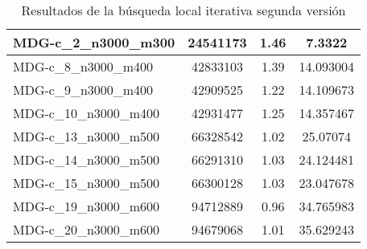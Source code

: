 \documentclass[11pt,a4paper]{article}
\begin{document}
\begin{table}[H]
\begin{center}
\begin{tabular}{|l|c|c|c|}
					MDG-c\_2\_n3000\_m300 & 24541173 & 1.46 & 7.3322 \\ \hline
					MDG-c\_8\_n3000\_m400 & 42833103 & 1.39 & 14.093004 \\ \hline
					MDG-c\_9\_n3000\_m400 & 42909525 & 1.22 & 14.109673 \\ \hline
					MDG-c\_10\_n3000\_m400 & 42931477 & 1.25 & 14.357467 \\ \hline
					MDG-c\_13\_n3000\_m500 & 66328542 & 1.02 & 25.07074 \\ \hline
					MDG-c\_14\_n3000\_m500 & 66291310 & 1.03 & 24.124481 \\ \hline
					MDG-c\_15\_n3000\_m500 & 66300128 & 1.03 & 23.047678 \\ \hline
					MDG-c\_19\_n3000\_m600 & 94712889 & 0.96 & 34.765983 \\ \hline
					MDG-c\_20\_n3000\_m600 & 94679068 & 1.01 & 35.629243 \\ \hline
				\end{tabular}
							\end{center}
				\caption{Resultados de la búsqueda local iterativa segunda versión}
				\label{}

			\end{table}
			
\end{document}
